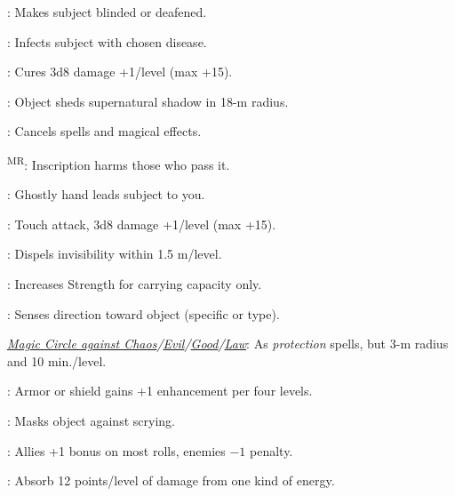 : Makes subject blinded or deafened.

: Infects subject with chosen disease.



: Cures 3d8 damage +1/level (max +15).


: Object sheds supernatural shadow in 18-m radius.

: Cancels spells and magical effects.


\textsuperscript{MR}: Inscription harms those who pass it.

: Ghostly hand leads subject to you.

: Touch attack, 3d8 damage +1/level (max +15).

: Dispels invisibility within 1.5 m/level.

: Increases Strength for carrying capacity only. %

: Senses direction toward object (specific or type).

\noindent\textit{\hyperref[spell:Magic Circle against Chaos]{Magic Circle against Chaos}/\hyperref[spell:Magic Circle against Evil]{Evil}/\hyperref[spell:Magic Circle against Good]{Good}/\hyperref[spell:Magic Circle against Law]{Law}}: As \emph{protection} spells, but 3-m radius and 10 min./level.

: Armor or shield gains +1 enhancement per four levels.


: Masks object against scrying.

: Allies +1 bonus on most rolls, enemies $-1$ penalty.

: Absorb 12 points/level of damage from one kind of energy.

